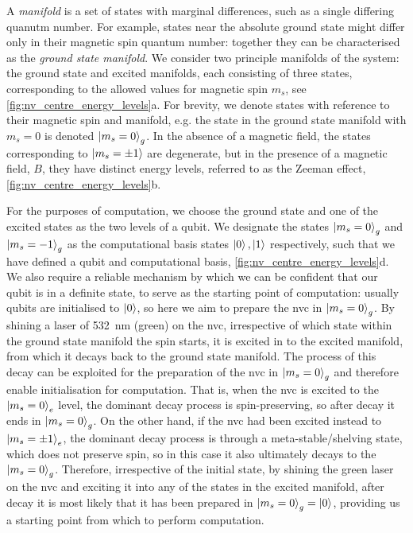A \emph{manifold} is a set of states with marginal differences, such as a single differing quanutm number.
For example, states near the absolute ground state might differ only in their magnetic spin quantum number:
    together they can be characterised as the \emph{ground state manifold}. 
We consider two principle manifolds of the system:
    the ground state and excited manifolds, each consisting of 
    three states, corresponding to the allowed values for magnetic spin $m_s$, see \cref{fig:nv_centre_energy_levels}a. 
For brevity, we denote states with reference to their magnetic spin and manifold, 
    e.g. the state in the ground state manifold with $m_s=0$ is denoted $\ket{m_s=0}_g$. 
In the absence of a magnetic field, the states corresponding to $\ket{m_s=\pm1}$ are degenerate, 
    but in the presence of a magnetic field, $B$, they have distinct energy levels, 
    referred to as the Zeeman effect, \cref{fig:nv_centre_energy_levels}b. 
\par 

For the purposes of computation, 
    we choose the ground state and one of the excited states as the two levels of a qubit. 
We designate the states $\ket{m_s=0}_g$ and $\ket{m_s=-1}_g$ as the computational basis states $\ket{0}, \ket{1}$ respectively, 
    such that we have defined a qubit and computational basis, \cref{fig:nv_centre_energy_levels}d.
We also require a reliable mechanism by which we can be confident that our qubit is in a definite state, 
    to serve as the starting point of computation: 
    usually qubits are initialised to $\ket{0}$, 
    so here we aim to prepare the \gls{nvc} in $\ket{m_s=0}_g$.
By shining a laser of \SI{532}{\nano\metre} (green) on the \gls{nvc}, irrespective of which state within the ground state manifold the spin starts, 
    it is excited in to the excited manifold, from which it decays back to the ground state manifold.
The process of this decay can be exploited for the preparation of the \gls{nvc} in $\ket{m_s=0}_g$ 
    and therefore enable initialisation for computation.
That is, when the \gls{nvc} is excited to the $\ket{m_s=0}_e$ level, the dominant decay process is spin-preserving, 
    so after decay it ends in $\ket{m_s=0}_g$. 
On the other hand, if the \gls{nvc} had been excited instead to $\ket{m_s=\pm1}_e$,
    the dominant decay process is through a meta-stable/shelving state, 
    which does not preserve spin, so in this case it also ultimately decays to the $\ket{m_s=0}_g$.
Therefore, irrespective of the initial state, 
    by shining the green laser on the \gls{nvc} and exciting it into any of the states in the excited manifold, 
    after decay it is most likely that it has been prepared in $\ket{m_s=0}_g = \ket{0}$, 
    providing us a starting point from which to perform computation.
\par 


